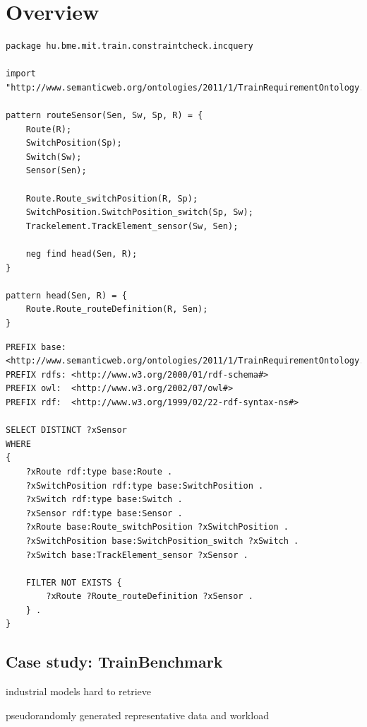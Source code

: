 \chapter{Overview}
\label{chap:overview}

\begin{lstlisting}[caption=The RouteSensor query in IQPL, label=lst:routesensor-iqpl]
package hu.bme.mit.train.constraintcheck.incquery

import "http://www.semanticweb.org/ontologies/2011/1/TrainRequirementOntology.owl" 

pattern routeSensor(Sen, Sw, Sp, R) = {
	Route(R);
	SwitchPosition(Sp);
	Switch(Sw);
	Sensor(Sen);
	
	Route.Route_switchPosition(R, Sp);
	SwitchPosition.SwitchPosition_switch(Sp, Sw);
	Trackelement.TrackElement_sensor(Sw, Sen);
	
	neg find head(Sen, R);	
}

pattern head(Sen, R) = {
	Route.Route_routeDefinition(R, Sen);
}
\end{lstlisting}


\begin{lstlisting}[caption=The RouteSensor query in SPARQL, label=lst:routesensor-sparql]
PREFIX base: <http://www.semanticweb.org/ontologies/2011/1/TrainRequirementOntology.owl#>
PREFIX rdfs: <http://www.w3.org/2000/01/rdf-schema#>
PREFIX owl:  <http://www.w3.org/2002/07/owl#>
PREFIX rdf:  <http://www.w3.org/1999/02/22-rdf-syntax-ns#>

SELECT DISTINCT ?xSensor
WHERE
{
    ?xRoute rdf:type base:Route .
    ?xSwitchPosition rdf:type base:SwitchPosition .
    ?xSwitch rdf:type base:Switch .
    ?xSensor rdf:type base:Sensor .
    ?xRoute base:Route_switchPosition ?xSwitchPosition .
    ?xSwitchPosition base:SwitchPosition_switch ?xSwitch .
    ?xSwitch base:TrackElement_sensor ?xSensor .

    FILTER NOT EXISTS {
        ?xRoute ?Route_routeDefinition ?xSensor .
    } .
}
\end{lstlisting}


\section{Case study: TrainBenchmark}

industrial models hard to retrieve

pseudorandomly generated representative data and workload

